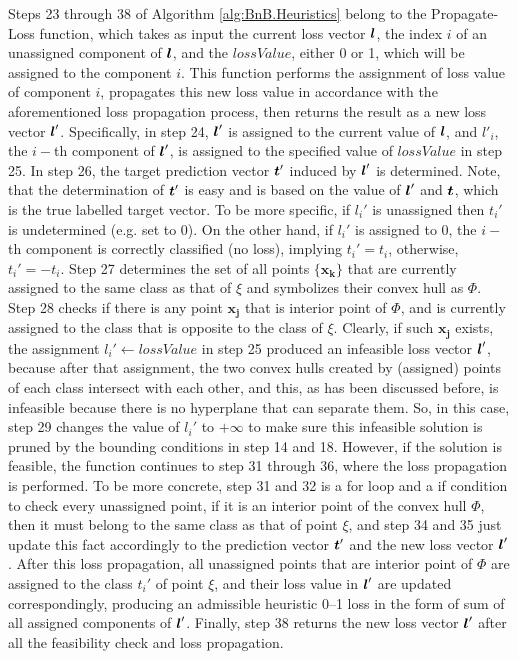 Steps 23 through 38 of Algorithm \ref{alg:BnB.Heuristics} belong to the {\sc Propagate-Loss} function, which takes as input the current loss vector $\boldsymbol{l}$, the index $i$ of an unassigned component of $\boldsymbol{l}$, and the $lossValue$, either 0 or 1, which will be assigned to the component $i$. This function performs the assignment of loss value of component $i$, propagates this new loss value in accordance with the aforementioned loss propagation process, then returns the result as a new loss vector $\boldsymbol{l}'$. Specifically, in step 24, $\boldsymbol{l}'$ is assigned to the current value of $\boldsymbol{l}$, and $l'_i$,  the $i-$th component of $\boldsymbol{l}'$, is assigned to the specified value of $lossValue$ in step 25. In step 26, the target prediction vector $\boldsymbol{t}'$ induced by $\boldsymbol{l}'$ is determined. Note, that the determination of $\boldsymbol{t}'$ is easy and is based on the value of $\boldsymbol{l}'$ and $\boldsymbol{t}$, which is the true labelled target vector. To be more specific, if $l_i'$ is unassigned then $t_i'$ is undetermined (e.g. set to 0). On the other hand, if $l_i'$ is assigned to 0, the $i-$th component is correctly classified (no loss), implying $t_i' = t_i$, otherwise, $t_i' = -t_i$. Step 27 determines the set of all points $\{ \boldsymbol{x_k} \}$ that are currently assigned to the same class as that of $\xi$ and symbolizes their convex hull as $\Phi$. Step 28 checks if there is any point $\boldsymbol{x_j}$ that is interior point of $\Phi$, and is currently assigned to the class that is opposite to the class of $\xi$. Clearly, if such $\boldsymbol{x_j}$ exists, the assignment $l_i' \gets lossValue$ in step 25 produced an infeasible loss vector $\boldsymbol{l}'$, because after that assignment, the two convex hulls created by (assigned) points of each class intersect with each other, and this, as has been discussed before, is infeasible because there is no hyperplane that can separate them. So, in this case, step 29 changes the value of $l_i'$ to $+\infty$ to make sure this infeasible solution is pruned by the bounding conditions in step 14 and 18. However, if the solution is feasible, the function continues to step 31 through 36, where the loss propagation is performed. To be more concrete, step 31 and 32 is a for loop and a if condition to check every unassigned point, if it is an interior point of the convex hull $\Phi$, then it must belong to the same class as that of point $\xi$, and step 34 and 35 just update this fact accordingly to the prediction vector $\boldsymbol{t}'$ and the new loss vector $\boldsymbol{l}'$. After this loss propagation, all unassigned points that are interior point of $\Phi$ are assigned to the class $t_i'$ of point $\xi$, and their loss value in $\boldsymbol{l}'$ are updated correspondingly, producing an admissible heuristic 0--1 loss in the form of sum of all assigned components of $\boldsymbol{l}'$. Finally, step 38 returns the new loss vector $\boldsymbol{l}'$ after all the feasibility check and loss propagation. 

